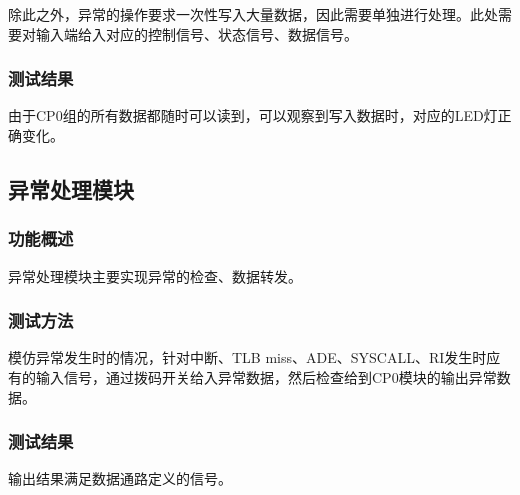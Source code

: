         除此之外，异常的操作要求一次性写入大量数据，因此需要单独进行处理。此处需要对输入端给入对应的控制信号、状态信号、数据信号。%

        \subsubsection{测试结果}
        由于CP0组的所有数据都随时可以读到，可以观察到写入数据时，对应的LED灯正确变化。


    \subsection{异常处理模块}
        \subsubsection{功能概述}
        异常处理模块主要实现异常的检查、数据转发。

        \subsubsection{测试方法}
        模仿异常发生时的情况，针对中断、TLB miss、ADE、SYSCALL、RI发生时应有的输入信号，通过拨码开关给入异常数据，然后检查给到CP0模块的输出异常数据。

        \subsubsection{测试结果}
        输出结果满足数据通路定义的信号。
        
